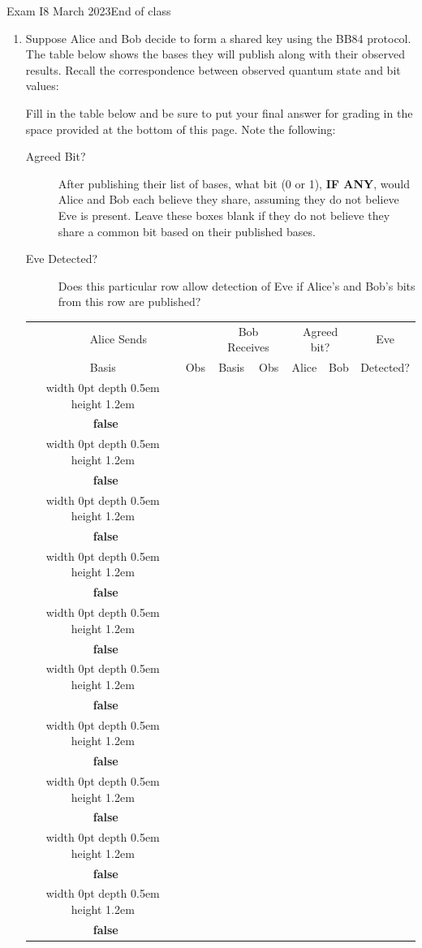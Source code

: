 \documentclass[12pt]{article}
\def\Gate#1{\mbox{\textbf{#1}}}
\def\Y{\Gate{Y}}
\def\Z{\Gate{Z}}
\def\H{\Gate{H}}
\def\Obox#1{\Ovalbox{\hbox to 1ex{\vrule width 0pt height 1ex\hss #1\hss}}}
\def\TFMarked#1#2{\ \stackbox[l][m]{\Obox{#1}~\textbf{true}\\\Obox{#2}~\textbf{false}}}
\def\TF{\TFMarked{\relax}{\relax}}
\newcommand{\Blank}[1][1in]{\mbox{\vrule width #1 depth 2pt}\vrule width 0pt height 2.0em}
\def\BlQb{\mbox{\ensuremath{\Blank[4em]\ket{0}+\Blank[4em]\ket{1}}}}
\begin{document}
\begin{assignment}{Exam I}{8 March 2023}{End of class}
\begin{enumerate}
\begin{itemize}
    \item We begin at the North pole of the Bloch sphere.
    \item We are in state \BlQb{}.
    \item We rotate about the \Z{} axis $\pi/4$ radians.  We are now at \BlQb{}.
    \item \vline height 2em width0pt We begin again at the North pole.
    \item We experience a \Y{} gate.  We are now at \BlQb{}.
    \item We then experience a \Z{} gate.  We are now at state \BlQb{}.
    \item We finally experience an \H{} gate.  We are now at state \BlQb{}.
\end{itemize}
\LeaveSpace{1in}
\item{}  Suppose Alice and Bob decide to form a shared key using the BB84 protocol.  The table below shows the bases they will publish along with their observed results.   Recall the correspondence between observed quantum state and bit values:
\begin{BBKey}
\begin{center}
\BBBasis{}
\end{center}
\end{BBKey}
\def\RowU#1#2#3#4{%
\vrule width 0pt depth 0.5em height 1.2em#1 &#2 & #3 & #4 & & & {\vrule width 0pt depth 13pt\small\TF{}}  \\ \hline}
\def\Row#1#2#3{%
\RowU{\STD}{#1}{#2}{#3}}
\def\RowX#1#2#3{%
\RowU{\HDM}{#1}{#2}{#3}}
\Continued{}
Fill in the table below and be sure to put your final answer for grading in the space provided at the bottom of this page.  Note the following:
\begin{description}
  \item[Agreed Bit?]  After publishing their list of bases, what bit (0 or 1), \textbf{IF ANY}, would Alice and Bob each believe they share, assuming they do not believe Eve is present. Leave these boxes blank if they do not believe they share a common bit based on their published bases.
  \item[Eve Detected?] Does this particular row allow detection of Eve if Alice's and Bob's bits from this row are published?
\end{description}

\begin{BBKey}
\begin{center}\Large
\begin{tabular}{c|c||c|c||c|c||c}
\multicolumn{2}{c||}{Alice Sends} & \multicolumn{2}{c||}{Bob Receives}& \multicolumn{2}{c||}{Agreed bit?}&Eve \\
Basis & Obs & Basis & Obs & Alice & Bob & Detected?\\\hline
\RowX{\BBNe}{\HDM}{\BBNe}
\Row{\BBUp}{\STD}{\BBUp}
\RowX{\BBNe}{\HDM}{\BBSe}
\Row{\BBRt}{\STD}{\BBRt}
\Row{\BBUp}{\HDM}{\BBNe}
\Row{\BBUp}{\STD}{\BBUp}\Row{\BBRt}{\HDM}{\BBSe}
\RowX{\BBSe}{\HDM}{\BBSe}
\Row{\BBRt}{\STD}{\BBUp}
\RowX{\BBNe}{\HDM}{\BBNe}


\end{tabular}
\end{center}
\end{BBKey}
\end{enumerate}
\end{assignment}
\end{document}
